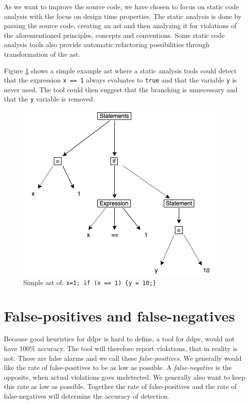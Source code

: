 \documentclass[pdftex,10pt,b5paper,twoside]{report}
\begin{document}
As we want to improve the source code, we have chosen to focus on static code analysis with the focus on design time properties. The static analysis is done by parsing the source code, creating an \gls{ast} and then analyzing it for violations of the aforementioned principles, concepts and conventions. Some static code analysis tools also provide automatic refactoring possibilities through transformation of the \gls{ast}.


Figure \ref{fig:ast} shows a simple example \gls{ast} where a static analysis tools could detect that the expression \texttt{x == 1} always evaluates to \texttt{true} and that the variable \texttt{y} is never used. The tool could then suggest that the branching is unnecessary and that the \texttt{y} variable is removed.  

\begin{figure}[h!]
	\centering
	\includegraphics[width=\linewidth/2]{report/images/ast.png}
	\caption{Simple \gls{ast} of: \texttt{x=1; if (x == 1) \{y = 10;\}}}
	\label{fig:ast}
\end{figure}



\section{False-positives and false-negatives}
Because good heuristics for \gls{ddpv} is hard to define, a tool for \gls{ddpv}, would not have 100\% accuracy. The tool will therefore report violations, that in reality is not. These are false alarms and we call these \textit{false-positives}. We generally would like the rate of false-positives to be as low as possible. A \textit{false-negative} is the opposite, when actual violations goes undetected. We generally also want to keep this rate as low as possible. Together the rate of false-positives and the rate of false-negatives will determine the accuracy of detection. 
\end{document}
